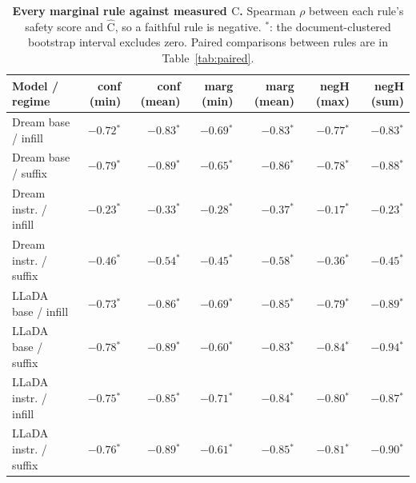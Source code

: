 \begin{table}[t]
\centering
\small
\setlength{\tabcolsep}{4pt}
\begin{tabular}{lrrrrrr}
\toprule
Model / regime & conf (min) & conf (mean) & marg (min) & marg (mean) & negH (max) & negH (sum) \\
\midrule
Dream base / infill & $-0.72$$^{*}$ & $-0.83$$^{*}$ & $-0.69$$^{*}$ & $-0.83$$^{*}$ & $-0.77$$^{*}$ & $-0.83$$^{*}$ \\
Dream base / suffix & $-0.79$$^{*}$ & $-0.89$$^{*}$ & $-0.65$$^{*}$ & $-0.86$$^{*}$ & $-0.78$$^{*}$ & $-0.88$$^{*}$ \\
Dream instr. / infill & $-0.23$$^{*}$ & $-0.33$$^{*}$ & $-0.28$$^{*}$ & $-0.37$$^{*}$ & $-0.17$$^{*}$ & $-0.23$$^{*}$ \\
Dream instr. / suffix & $-0.46$$^{*}$ & $-0.54$$^{*}$ & $-0.45$$^{*}$ & $-0.58$$^{*}$ & $-0.36$$^{*}$ & $-0.45$$^{*}$ \\
LLaDA base / infill & $-0.73$$^{*}$ & $-0.86$$^{*}$ & $-0.69$$^{*}$ & $-0.85$$^{*}$ & $-0.79$$^{*}$ & $-0.89$$^{*}$ \\
LLaDA base / suffix & $-0.78$$^{*}$ & $-0.89$$^{*}$ & $-0.60$$^{*}$ & $-0.83$$^{*}$ & $-0.84$$^{*}$ & $-0.94$$^{*}$ \\
LLaDA instr. / infill & $-0.75$$^{*}$ & $-0.85$$^{*}$ & $-0.71$$^{*}$ & $-0.84$$^{*}$ & $-0.80$$^{*}$ & $-0.87$$^{*}$ \\
LLaDA instr. / suffix & $-0.76$$^{*}$ & $-0.89$$^{*}$ & $-0.61$$^{*}$ & $-0.85$$^{*}$ & $-0.81$$^{*}$ & $-0.90$$^{*}$ \\
\bottomrule
\end{tabular}
\caption{\textbf{Every marginal rule against measured $\mathrm{C}$.} Spearman $\rho$
between each rule's safety score and $\widehat{\mathrm{C}}$, so a faithful rule is
negative. $^{*}$: the document-clustered bootstrap interval excludes zero. Paired
comparisons between rules are in Table~\ref{tab:paired}.}
\label{tab:fidelity}
\end{table}
